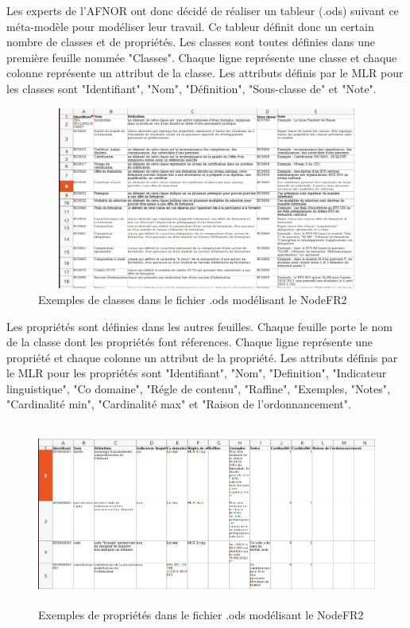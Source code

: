 \documentclass{article}
\begin{document}
Les experts de l'AFNOR ont donc décidé de réaliser un tableur (.ods) suivant ce méta-modèle pour modéliser leur travail. Ce tableur définit donc un certain nombre de classes et de propriétés. Les classes sont toutes définies dans une première feuille nommée "Classes". Chaque ligne représente une classe et chaque colonne représente un attribut de la classe. Les attributs définis par le MLR pour les classes sont "Identifiant", "Nom", "Définition", "Sous-classe de" et "Note".\\

\newpage

\begin{figure}[!ht]
    \center
    \includegraphics[width=13cm, height=6cm]{img/classes}
    \caption{Exemples de classes dans le fichier .ods modélisant le NodeFR2}
\end{figure}

Les propriétés sont définies dans les autres feuilles. Chaque feuille porte le nom de la classe dont les propriétés font réferences. Chaque ligne représente une propriété et chaque colonne un attribut de la propriété. Les attributs définis par le MLR pour les propriétés sont "Identifiant", "Nom", "Definition", "Indicateur linguistique", "Co domaine", "Régle de contenu", "Raffine", "Exemples, "Notes", "Cardinalité min", "Cardinalité max" et "Raison de l'ordonnancement".

\begin{figure}[!ht]
    \center
    \includegraphics[width=13cm, height=6cm]{img/proprietes}
    \caption{Exemples de propriétés dans le fichier .ods modélisant le NodeFR2}
\end{figure}
\end{document}
